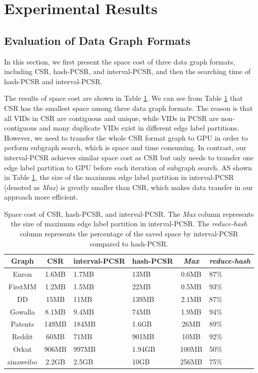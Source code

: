 \section{Experimental Results}


\subsection{Evaluation of Data Graph Formats}
In this section, we first present the space cost of three data graph formats, including CSR, hash-PCSR, and  interval-PCSR, and then the searching time of hash-PCSR and interval-PCSR. 

The results of space cost are shown in Table \ref{tab:graphsize}. We can see from Table \ref{tab:graphsize} that CSR has the smallest space among three data graph formats. The reason is that all VIDs in CSR are contiguous and unique, while VIDs in PCSR are non-contiguous and many duplicate VIDs exist in different edge label partitions. However, we need to transfer the whole CSR format graph to GPU in order to perform subgraph search, which is space and time consuming. In contrast, our interval-PCSR achieves similar space cost as CSR but only needs to transfer one edge label partition to GPU before each iteration of subgraph search. AS shown in Table \ref{tab:graphsize}, the size of the maximum edge label partition in interval-PCSR (denoted as \emph{Max}) is greatly smaller than CSR, which makes data transfer in our approach more efficient.


\begin{table}
\centering
  \caption{Space cost of CSR, hash-PCSR, and interval-PCSR. The \emph{Max} column represents the size of maximum edge label partition in interval-PCSR. The \emph{reduce-hash} column represents the percentage of the saved space by interval-PCSR compared to hash-PCSR.}
  \label{tab:graphsize}
  \begin{tabular}{ccp{30pt}p{30pt}cp{30pt}}
  \hline
    Graph &CSR&interval-PCSR&hash-PCSR&\emph{Max}&\emph{reduce-hash}\\
    \hline
    Enron 		&1.6MB	&1.7MB	&13MB	&0.6MB	&87\% \\
    FirstMM 	&1.2MB	&1.5MB	&22MB	&0.5MB	&93\% \\
    DD 			&15MB	&11MB	&139MB	&2.1MB	&87\% \\
    Gowalla 	&8.1MB	&9.4MB	&74MB	&1.9MB	&94\% \\
    Patents 	&149MB	&184MB	&1.6GB	&26MB	&89\% \\
    Reddit 		&60MB	&71MB	&901MB	&10MB	&92\% \\
    Orkut 		&906MB	&997MB	&1.94GB	&100MB	&50\% \\
    sinaweibo	&2.2GB	&2.5GB	&10GB	&256MB	&75\% \\

    \hline
  \end{tabular}
\end{table}

